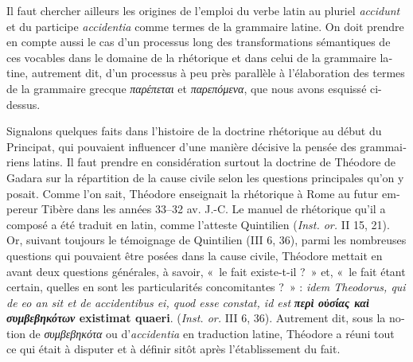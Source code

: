 \documentclass[output=paper]{langsci/langscibook}
\begin{document}
\begin{otherlanguage}{french}
Il faut chercher ailleurs les origines de l’emploi du verbe latin au pluriel \textit{accidunt} et du participe \textit{accidentia} comme termes de la grammaire latine. On doit prendre en compte aussi le cas d’un processus long des transformations sémantiques de ces vocables dans le domaine de la rhétorique et dans celui de la grammaire latine, autrement dit, d’un processus à peu près parallèle à l’élaboration des termes de la grammaire grecque \textit{παρέπεται} et \textit{παρεπόμενα}, que nous avons esquissé ci-dessus.

Signalons quelques faits dans l’histoire de la doctrine rhétorique au début du Principat, qui pouvaient influencer d’une manière décisive la pensée des grammairiens latins. Il faut prendre en considération surtout la doctrine de Théodore de Gadara sur la répartition de la cause civile selon les questions principales qu’on y posait. Comme l’on sait, Théodore enseignait la rhétorique à Rome au futur empereur Tibère dans les années 33–32 av. J.-C. Le manuel de rhétorique qu’il a composé a été traduit en latin, comme l’atteste Quintilien (\textit{Inst. or.} II 15, 21). Or, suivant toujours le témoignage de Quintilien (III 6, 36), parmi les nombreuses questions qui pouvaient être posées dans la cause civile, Théodore mettait en avant deux questions générales, à savoir, «~le fait existe-t-il ?~» et, «~le fait étant certain, quelles en sont les particularités concomitantes ?~» : \textit{idem Theodorus, qui de eo an sit et de accidentibus ei, quod esse constat, id est} \textbf{\textit{περὶ οὐσίας καὶ συμβεβηκότων} existimat quaeri}. (\textit{Inst. or.} III 6, 36). Autrement dit, sous la notion de \textit{συμβεβηκότα} ou d’\textit{accidentia} en traduction latine, Théodore a réuni tout ce qui était à disputer et à définir sitôt après l’établissement du fait.


\end{otherlanguage}
\end{document}
